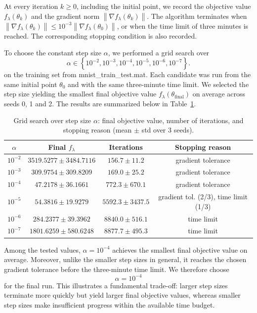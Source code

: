 \documentclass{article}
\theoremstyle{definition}
\theoremstyle{remark}
\newcommand \norm[1]{\left\lVert #1 \right\rVert}
\begin{document}
At every iteration $k\geq 0$, including the initial point, we record the objective value $f_\lambda(\theta_k)$ and the gradient norm $\norm{\nabla f_\lambda(\theta_k)}$. The algorithm terminates when $\norm{\nabla f_\lambda(\theta_k)} \leq 10^{-3}\norm{\nabla f_\lambda(\theta_0)}$, or when the time limit of three minutes is reached. The corresponding stopping condition is also recorded.

To choose the constant step size $\alpha$, we performed a grid search over
\[
\alpha\in
\left\{
10^{-2},10^{-3},10^{-4},10^{-5},10^{-6},10^{-7}
\right\}.
\]
on the training set from mnist\_train\_test.mat.
Each candidate was run from the same initial point $\theta_0$ and with the same three-minute time limit. We selected the step size yielding the smallest final objective value $f_\lambda(\theta_{\mathrm{final}})$ on average across seeds 0, 1 and 2. The results are summarized below in Table~\ref{tab:q4_grid_search}.

\begin{table}[h]
\centering
\caption{Grid search over step size $\alpha$: final objective value, number of iterations, and stopping reason (mean $\pm$ std over 3 seeds).}
\label{tab:q4_grid_search}
\begin{tabular}{c|c|c|c}
$\alpha$ &
Final $f_\lambda$ &
Iterations &
Stopping reason
\\ \hline
$10^{-2}$ & $3519.5277 \pm 3484.7116$ & $156.7 \pm 11.2$ & gradient tolerance \\
$10^{-3}$ & $309.9754 \pm 309.8209$ & $169.0 \pm 25.2$ & gradient tolerance \\
$10^{-4}$ & $47.2178 \pm 36.1661$ & $772.3 \pm 670.1$ & gradient tolerance \\
$10^{-5}$ & $54.3816 \pm 19.9279$ & $5592.3 \pm 3437.5$ & gradient tol. (2/3), time limit (1/3) \\
$10^{-6}$ & $284.2377 \pm 39.3962$ & $8840.0 \pm 516.1$ & time limit \\
$10^{-7}$ & $1801.6259 \pm 580.6248$ & $8877.7 \pm 495.3$ & time limit
\end{tabular}
\end{table}

Among the tested values, $\alpha=10^{-4}$ achieves the smallest final objective value on average. Moreover, unlike the smaller step sizes in general, it reaches the chosen gradient tolerance before the three-minute time limit. We therefore choose
\[
\boxed{\alpha=10^{-4}}
\]
for the final run. This illustrates a fundamental trade-off: larger step sizes terminate more quickly but yield larger final objective values, whereas smaller step sizes make insufficient progress within the available time budget.
\end{document}
